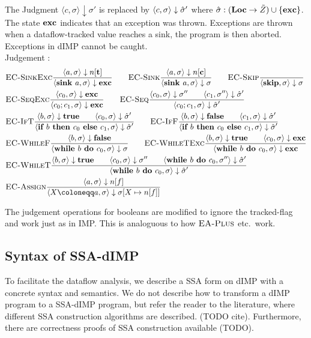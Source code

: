 The Judgment $\langle c, \sigma \rangle \downarrow \sigma'$ is replaced by 
$\langle c, \sigma \rangle \downarrow \hat{\sigma}'$
where $\hat{\sigma}{}: (\textbf{Loc} \to \tilde{Z}) \cup \{\textbf{exc}\}$.
The state $\textbf{exc}$ indicates that an exception was thrown.
Exceptions are thrown when a dataflow-tracked value reaches a sink, the program
is then aborted.
Exceptions in dIMP cannot be caught.
\\
Judgement :
\begin{align*}
    &\bsrule{EC-SinkExc}{\bigstep{a}{\store}{\tracked{}}}
    {\bigstep{\defaultsink}{\store}{\exception}} \qquad
    \bsrule{EC-Sink}{\bigstep{a}{\store}{\clean{}}}
    {\bigstep{\defaultsink}{\store}{\store}} \qquad
    \bsrule{EC-Skip}{}{\bigstep{\skipcmd}{\store}{\store}}\\
    &\bsrule{EC-SeqExc}{\bigstep{c_0}{\sigma}{\exception}}
    {\bigstep{\defaultseq}{\store}{\exception}} \qquad
    \bsrule{EC-Seq}{\bigstep{c_0}{\sigma}{\store''} \qquad \bigstep{c_1}{\store''}{\excstore'}}
    {\bigstep{\defaultseq}{\store}{\excstore'}}\\
    &\bsrule{EC-IfT}{\bigstep{b}{\store}{\btrue}\qquad \bigstep{c_0}{\store}{\excstore'}}
    {\bigstep{\defaultif}{\store}{\excstore'}} \qquad
    \bsrule{EC-IfF}{\bigstep{b}{\store}{\bfalse}\qquad \bigstep{c_1}{\store}{\excstore'}}
    {\bigstep{\defaultif}{\store}{\excstore'}}\\
    &\bsrule{EC-WhileF}{\bigstep{b}{\sigma}{\bfalse}}
    {\bigstep{\defaultwhile}{\store}{\store}} \qquad
    \bsrule{EC-WhileTExc}{\bigstep{b}{\sigma}{\btrue} \qquad \bigstep{c_0}{\store}{\exception}}
    {\bigstep{\defaultwhile}{\store}{\exception}}\\
    &\bsrule{EC-WhileT}{\bigstep{b}{\sigma}{\btrue} \qquad \bigstep{c_0}{\store}{\store''}\qquad
    \bigstep{\defaultwhile}{\store''}{\excstore'}}
    {\bigstep{\defaultwhile}{\store}{\excstore'}}\\
    &\bsrule{EC-Assign}{\bigstep{a}{\store}{\flagged{}}}
    {\bigstep{\defaultstore}{\store}{\store{}[X \mapsto \flagged{}]}}
\end{align*}

The judgement operations for booleans are modified to ignore the tracked-flag and work
just as in IMP. This is analoguous to how $\textsc{EA-Plus}$ etc.\ work.

\subsection{Syntax of SSA-dIMP}
To facilitate the dataflow analysis, we describe a SSA form on dIMP with a concrete
syntax and semantics.
We do not describe how to transform a dIMP program to a SSA-dIMP program, but 
refer the reader to the literature, where different SSA construction algorithms are
described. (TODO cite). Furthermore, there are correctness proofs of SSA construction
available (TODO).

